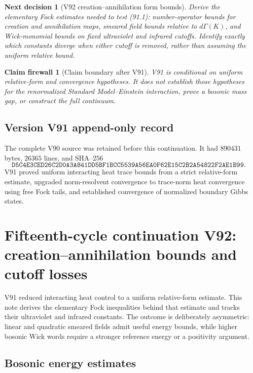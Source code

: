 \documentclass[11pt]{article}
\newtheorem{firewall}[theorem]{Claim firewall}
\newtheorem{decision}[theorem]{Next decision}
\theoremstyle{remark}
\begin{document}
\begin{decision}[V92 creation--annihilation form bounds]
\label{dec:v15v91-next}
Derive the elementary Fock estimates needed to test (91.1):
number-operator bounds for creation and annihilation maps, smeared
field bounds relative to \(d\Gamma(K)\), and Wick-monomial bounds
on fixed ultraviolet and infrared cutoffs.  Identify exactly which
constants diverge when either cutoff is removed, rather than
assuming the uniform relative bound.
\end{decision}

\begin{firewall}[Claim boundary after V91]
\label{fire:v15v91}
V91 is conditional on uniform relative-form and convergence
hypotheses.  It does not establish those hypotheses for the
renormalized Standard Model--Einstein interaction, prove a bosonic
mass gap, or construct the full continuum.
\end{firewall}

\section*{Version V91 append-only record}
The complete V90 source was retained before this continuation.  It
had \(890431\) bytes, \(26365\) lines, and SHA--256
\[
 \texttt{D5C4E3CED26C2D0A3A841DD5BF1BCC5539A56EA0F62E15C2B2A54822F2AE1B99}.
\]
V91 proved uniform interacting heat trace bounds from a strict
relative-form estimate, upgraded norm-resolvent convergence to
trace-norm heat convergence using free Fock tails, and established
convergence of normalized boundary Gibbs states.
\chapter{Fifteenth-cycle continuation V92: creation--annihilation bounds and cutoff losses}
\label{sec:v15v92}

V91 reduced interacting heat control to a uniform relative-form
estimate.  This note derives the elementary Fock inequalities behind
that estimate and tracks their ultraviolet and infrared constants.
The outcome is deliberately asymmetric: linear and quadratic
smeared fields admit useful energy bounds, while higher bosonic
Wick words require a stronger reference energy or a positivity
argument.

\section{Bosonic energy estimates}
\end{document}
